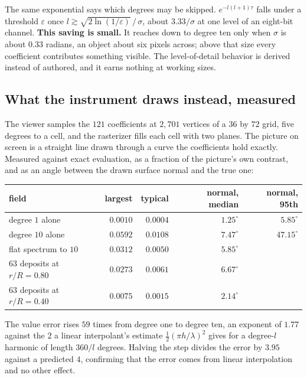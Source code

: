The same exponential says which degrees may be skipped. \(e^{-l(l+1)\tau}\) falls under a threshold \(\varepsilon\) once \(l \gtrsim \sqrt{2\ln(1/\varepsilon)}\,/\,\sigma\), about \(3.33/\sigma\) at one level of an eight-bit channel. \textbf{This saving is small.} It reaches down to degree ten only when \(\sigma\) is about \(0.33\) radians, an object about six pixels across; above that size every coefficient contributes something visible. The level-of-detail behavior is derived instead of authored, and it earns nothing at working sizes.

\subsection{What the instrument draws instead, measured}

The viewer samples the \(121\) coefficients at \(2{,}701\) vertices of a \(36\) by \(72\) grid, five degrees to a cell, and the rasterizer fills each cell with two planes. The picture on screen is a straight line drawn through a curve the coefficients hold exactly. Measured against exact evaluation, as a fraction of the picture's own contrast, and as an angle between the drawn surface normal and the true one:

\begin{center}
\begin{tabular}{lrrrr}
\toprule
field & largest & typical & normal, median & normal, 95th \\
\midrule
degree \(1\) alone & \(0.0010\) & \(0.0004\) & \(1.25^\circ\) & \(5.85^\circ\) \\
degree \(10\) alone & \(0.0592\) & \(0.0108\) & \(7.47^\circ\) & \(\mathbf{47.15^\circ}\) \\
flat spectrum to \(10\) & \(0.0312\) & \(0.0050\) & \(5.85^\circ\) & \textemdash{} \\
\(63\) deposits at \(r/R = 0.80\) & \(0.0273\) & \(0.0061\) & \(6.67^\circ\) & \textemdash{} \\
\(63\) deposits at \(r/R = 0.40\) & \(0.0075\) & \(0.0015\) & \(2.14^\circ\) & \textemdash{} \\
\bottomrule
\end{tabular}
\end{center}

The value error rises \(59\) times from degree one to degree ten, an exponent of \(1.77\) against the \(2\) a linear interpolant's estimate \(\tfrac12(\pi h/\lambda)^2\) gives for a degree-\(l\) harmonic of length \(360/l\) degrees. Halving the step divides the error by \(3.95\) against a predicted \(4\), confirming that the error comes from linear interpolation and no other effect.

